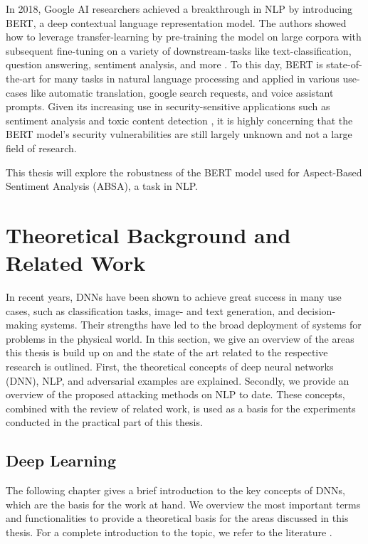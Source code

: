 In 2018, Google AI researchers achieved a breakthrough in NLP by introducing BERT, a deep contextual language representation model. The authors showed how to leverage transfer-learning by pre-training the model on large corpora with subsequent fine-tuning on a variety of downstream-tasks like text-classification, question answering, sentiment analysis, and more \cite{devlin2018bert}. To this day, BERT is state-of-the-art for many tasks in natural language processing and applied in various use-cases like automatic translation, google search requests, and voice assistant prompts. 
Given its increasing use in security-sensitive applications such as sentiment analysis \cite{prabowo2009sentiment} and toxic content detection \cite{singhania20173han}, it is highly concerning that the BERT model's security vulnerabilities are still largely unknown and not a large field of research.

This thesis will explore the robustness of the BERT model used for Aspect-Based Sentiment Analysis (ABSA), a task in NLP. 



\section{Theoretical Background and Related Work}

In recent years, DNNs have been shown to achieve great success in many use cases, such as classification tasks, image- and text generation, and decision-making systems. Their strengths have led to the broad deployment of systems for problems in the physical world. 
In this section, we give an overview of the areas this thesis is build up on and the state of the art related to the respective research is outlined. First, the theoretical concepts of deep neural networks (DNN), NLP, and adversarial examples are explained. Secondly, we provide an overview of the proposed attacking methods on NLP to date. These concepts, combined with the review of related work, is used as a basis for the experiments conducted in the practical part of this thesis. 

\subsection{Deep Learning}
The following chapter gives a brief introduction to the key concepts of DNNs, which are the basis for the work at hand. We overview the most important terms and functionalities to provide a theoretical basis for the areas discussed in this thesis. For a complete introduction to the topic, we refer to the literature \cite{bengio2017deep}.

